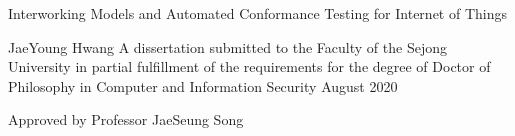 \begin{titlepage}
    \begin{center}
    	
        \vfill
        \fontsize{21}{11}\textnormal {Interworking Models and Automated Conformance Testing for Internet of Things}
        \vfill
        
        
        \vfill
        \textnormal{\Large JaeYoung Hwang}
        \vfill
        \textnormal{\large A dissertation submitted to the Faculty of the Sejong University in partial fulfillment of the requirements for the degree of Doctor of Philosophy in Computer and Information Security}
        \vfill
        \textnormal{\large August 2020}
        \vfill
        
        
        \textnormal{\large Approved by Professor JaeSeung Song}
        \vfill
    \end{center}
\end{titlepage}